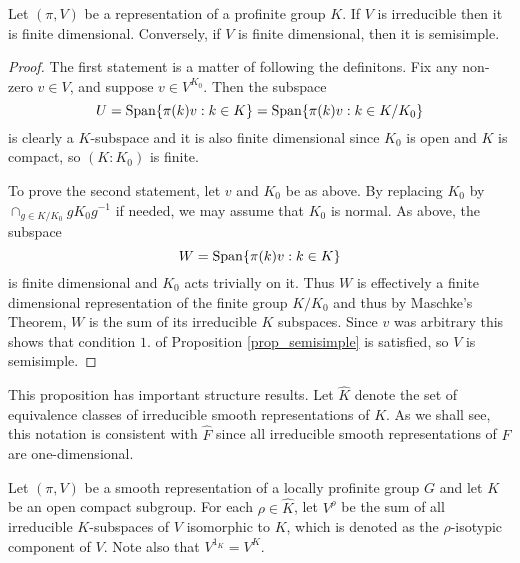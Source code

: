 \begin{prop}\label{lem_profinite_smooth}
    Let $(\pi,V)$ be a representation of a profinite group $K$. If $V$ is irreducible then it is finite dimensional. Conversely, if $V$ is finite dimensional, then it is semisimple.
\end{prop}

\begin{proof}
    The first statement is a matter of following the definitons. Fix any non-zero $v\in V$, and suppose $v\in V^{K_0}$. Then the subspace 
    $$U=\mathrm{Span}\{\pi(k)v:k\in K\}=\mathrm{Span}\{\pi(k)v:k\in K/K_0\}$$
    is clearly a $K$-subspace and it is also finite dimensional since $K_0$ is open and $K$ is compact, so $(K:K_0)$ is finite.   

    To prove the second statement, let $v$ and $K_0$ be as above. By replacing $K_0$ by $\cap_{g\in K/K_0}gK_0g^{-1}$ if needed, we may assume that $K_0$ is normal. As above, the subspace 
    $$W=\mathrm{Span}\{\pi(k)v:k\in K\}$$
    is finite dimensional and $K_0$ acts trivially on it.
    Thus $W$ is effectively a finite dimensional representation of the finite group $K/K_0$ and thus by Maschke's Theorem, $W$ is the sum of its irreducible $K$ subspaces. Since $v$ was arbitrary this shows that condition $1.$ of Proposition \ref{prop_semisimple} is satisfied, so $V$ is semisimple.

\end{proof}

This proposition has important structure results. Let $\hat{K}$ denote the set of equivalence classes of irreducible smooth representations of $K$. As we shall see, this notation is consistent with $\hat{F}$ since all irreducible smooth representations of $F$ are one-dimensional.

Let $(\pi,V)$ be a smooth representation of a locally profinite group $G$ and let $K$ be an open compact subgroup. For each $\rho\in\hat{K}$, let $V^\rho$ be the sum of all irreducible $K$-subspaces of $V$ isomorphic to $K$, which is denoted as the $\rho$-isotypic component of $V$. Note also that $V^{1_K}=V^K$.

